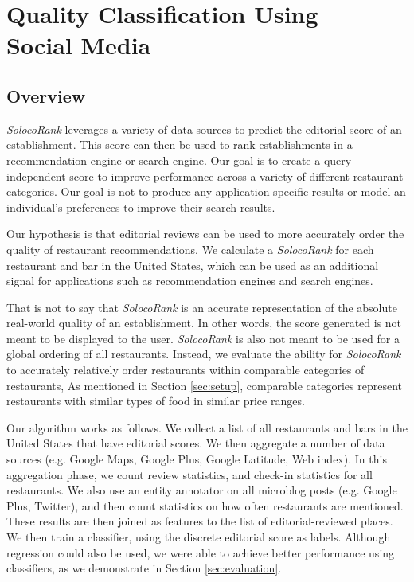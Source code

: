 \section{Quality Classification Using \\Social Media}
\label{sec:design}
\subsection{Overview}

\emph{SolocoRank} leverages a variety of data sources
to predict the editorial score of an establishment.
This score can then be used to rank establishments in a recommendation engine
or search engine.
Our goal is to create a query-independent score to improve performance
across a variety of different restaurant categories.
Our goal is not to produce any application-specific results or model
an individual's preferences to improve their search results.

Our hypothesis is that editorial reviews can be used to more accurately
order the quality of restaurant recommendations.
We calculate a \emph{SolocoRank} for each restaurant and bar in the United States,
which can be used as an additional signal for applications such as
recommendation engines and search engines.

That is not to say that \emph{SolocoRank} is an accurate representation of
the absolute real-world quality of an establishment.
In other words, the score generated is not meant to be displayed to the user.
\emph{SolocoRank} is also not meant to be used for a global ordering of all
restaurants. 
Instead, we evaluate the ability for \emph{SolocoRank} to accurately relatively
order restaurants within comparable categories of restaurants,
As mentioned in Section \ref{sec:setup}, comparable categories represent
restaurants with similar types of food in similar price ranges.

Our algorithm works as follows. 
We collect a list of all restaurants and bars in the United States that have
editorial scores.
We then aggregate a number of data sources (e.g. Google Maps, Google Plus,
Google Latitude, Web index).
In this aggregation phase, we count review statistics, and check-in statistics
for all restaurants.
We also use an entity annotator on all microblog posts (e.g. Google Plus, Twitter), and then
count statistics on how often restaurants are mentioned.
These results are then joined as features to the list of editorial-reviewed places.
We then train a classifier, using the discrete editorial score as labels.
Although regression could also be used, we were able to achieve better performance
using classifiers, as we demonstrate in Section \ref{sec:evaluation}.

